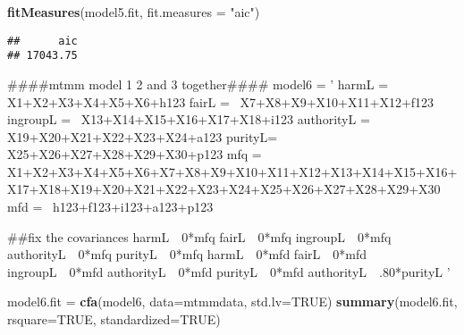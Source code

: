 \documentclass[english,man]{apa6}
\newenvironment{Shaded}{\begin{snugshade}}{\end{snugshade}}
\newcommand{\KeywordTok}[1]{\textcolor[rgb]{0.13,0.29,0.53}{\textbf{#1}}}
\newcommand{\DataTypeTok}[1]{\textcolor[rgb]{0.13,0.29,0.53}{#1}}
\newcommand{\StringTok}[1]{\textcolor[rgb]{0.31,0.60,0.02}{#1}}
\newcommand{\OtherTok}[1]{\textcolor[rgb]{0.56,0.35,0.01}{#1}}
\newcommand{\NormalTok}[1]{#1}
\newcounter{author}
\theoremstyle{definition}
\theoremstyle{definition}
\theoremstyle{definition}
\theoremstyle{remark}
\begin{document}
\begin{Shaded}
\begin{Highlighting}[]
\KeywordTok{fitMeasures}\NormalTok{(model5.fit, }\DataTypeTok{fit.measures =} \StringTok{"aic"}\NormalTok{)}
\end{Highlighting}
\end{Shaded}

\begin{verbatim}
##      aic 
## 17043.75
\end{verbatim}

\begin{Shaded}
\begin{Highlighting}[]
\NormalTok{####mtmm model 1 2 and 3 together####}
\NormalTok{model6 =}\StringTok{ '}
\StringTok{harmL =~ X1+X2+X3+X4+X5+X6+h123}
\StringTok{fairL =~ X7+X8+X9+X10+X11+X12+f123}
\StringTok{ingroupL =~ X13+X14+X15+X16+X17+X18+i123}
\StringTok{authorityL =~ X19+X20+X21+X22+X23+X24+a123}
\StringTok{purityL=~ X25+X26+X27+X28+X29+X30+p123}
\StringTok{mfq =~ X1+X2+X3+X4+X5+X6+X7+X8+X9+X10+X11+X12+X13+X14+X15+X16+X17+X18+X19+X20+X21+X22+X23+X24+X25+X26+X27+X28+X29+X30}
\StringTok{mfd =~ h123+f123+i123+a123+p123}

\StringTok{##fix the covariances}
\StringTok{harmL~~0*mfq}
\StringTok{fairL~~0*mfq}
\StringTok{ingroupL~~0*mfq}
\StringTok{authorityL~~0*mfq}
\StringTok{purityL~~0*mfq}
\StringTok{harmL~~0*mfd}
\StringTok{fairL~~0*mfd}
\StringTok{ingroupL~~0*mfd}
\StringTok{authorityL~~0*mfd}
\StringTok{purityL~~0*mfd}
\StringTok{authorityL~~.80*purityL}
\StringTok{'}

\NormalTok{model6.fit =}\StringTok{ }\KeywordTok{cfa}\NormalTok{(model6, }\DataTypeTok{data=}\NormalTok{mtmmdata, }\DataTypeTok{std.lv=}\OtherTok{TRUE}\NormalTok{)}
\KeywordTok{summary}\NormalTok{(model6.fit, }\DataTypeTok{rsquare=}\OtherTok{TRUE}\NormalTok{, }\DataTypeTok{standardized=}\OtherTok{TRUE}\NormalTok{)}
\end{Highlighting}
\end{Shaded}
\end{document}
